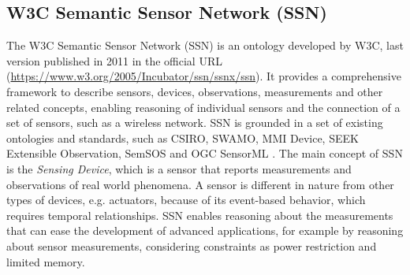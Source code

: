 \documentclass{sig-alternate-05-2015}
\begin{document}
\subsection{W3C Semantic Sensor Network (SSN)}
The W3C Semantic Sensor Network (SSN) \cite{Compton2012} is an ontology developed by W3C, last version published in 2011 in the official URL (\url{https://www.w3.org/2005/Incubator/ssn/ssnx/ssn}). It provides a comprehensive framework to describe sensors, devices, observations, measurements and other related concepts, enabling reasoning of individual sensors and the connection of a set of sensors, such as a wireless network. SSN is grounded in a set of existing ontologies and standards, such as CSIRO, SWAMO, MMI Device, SEEK Extensible Observation, SemSOS and OGC SensorML \cite{Ganzha2016a}. The main concept of SSN is the \textit{Sensing Device}, which is a sensor that reports measurements and observations of real world phenomena. A sensor is different in nature from other types of devices, e.g. actuators, because of its event-based behavior, which requires temporal relationships. SSN enables reasoning about the measurements that can ease the development of advanced applications, for example by reasoning about sensor measurements, considering constraints as power restriction and limited memory. 
\end{document}
